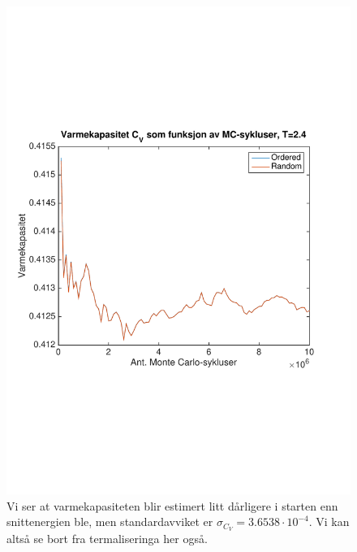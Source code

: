 \documentclass[norsk, 10pt]{article}
\begin{document}
\begin{figure}[H]
\centering
\includegraphics[scale = 0.6, trim = 1cm 8cm 1cm 8cm]{b_varmekap_MC_L2_T24.pdf}
\caption{Vi ser at varmekapasiteten blir estimert litt dårligere i starten enn snittenergien ble, men standardavviket er $\sigma_{C_V} = 3.6538\cdot10^{-4}$. Vi kan altså se bort fra termaliseringa her også.}
\label{fig:varmekapT24}
\end{figure}
\end{document}
